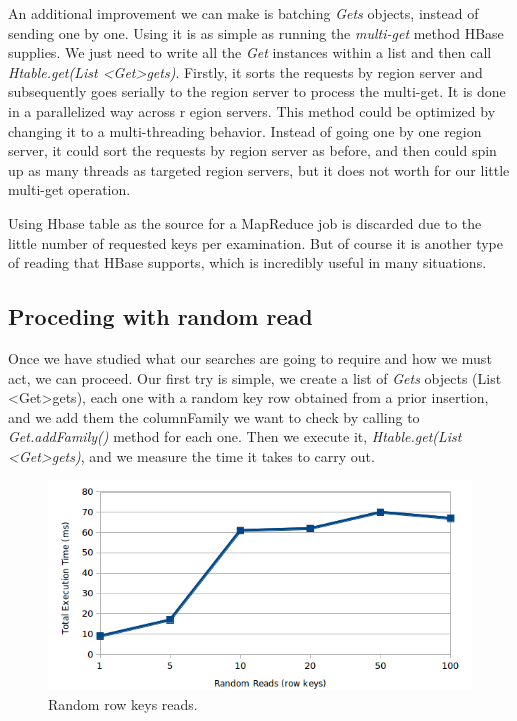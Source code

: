 An additional improvement we can make is batching \textit{Gets} objects, instead of sending one by one. Using it is as simple as running the \textit{multi-get} method HBase supplies. We just need to write all the \textit{Get} instances within a list and then call \textit{Htable.get(List \textless{Get}\textgreater gets)}. Firstly, it sorts the requests by region server and subsequently goes serially to the region server to process the multi-get. It is done in a parallelized way across r egion servers. 
This method could be optimized by changing it to a multi-threading behavior. Instead of going one by one region server, it could sort the requests by region server as before, and then could spin up as many threads as targeted region servers, but it does not worth for our little multi-get operation.
\par
Using Hbase table as the source for a MapReduce job is discarded due to the little number of requested keys per examination. But of course it is another type of reading that HBase supports, which is incredibly useful in many situations. 


\subsection{Proceding with random read}

Once we have studied what our searches are going to require and how we must act, we can proceed. Our first try is simple, we create a list of \textit{Gets} objects (List \textless{Get}\textgreater gets), each one with a random key row obtained from a prior insertion, and we add them the columnFamily we want to check by calling to \textit{Get.addFamily()} method for each one. Then we execute it, \textit{Htable.get(List \textless{Get}\textgreater gets)}, and we measure the time it takes to carry out.


\begin{figure}[htb]
\centering
\includegraphics[width=1\textwidth]{./images/randomReads2.png}
\caption{Random row keys reads.} \label{fig:randomReads}
\end{figure}




